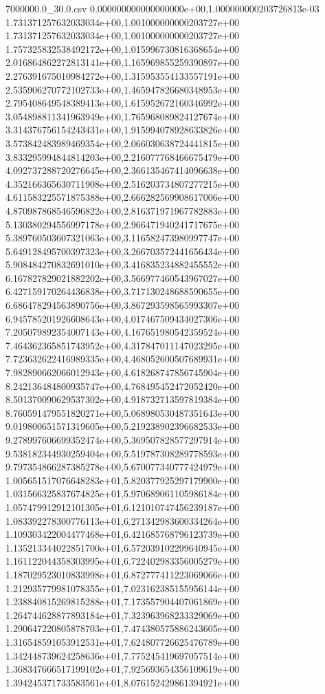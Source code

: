 \begin{filecontents*}{7000000.0_30.0.csv}
0.000000000000000000e+00,1.000000000203726813e-03
1.731371257632033034e+00,1.001000000000203727e+00
1.731371257632033034e+00,1.001000000000203727e+00
1.757325832538492172e+00,1.015996730816368654e+00
2.016864862272813141e+00,1.165969855259390897e+00
2.276391675010984272e+00,1.315953554133557191e+00
2.535906270772102733e+00,1.465947826680348953e+00
2.795408649548389413e+00,1.615952672160346992e+00
3.054898811341963949e+00,1.765968089824127674e+00
3.314376756154243431e+00,1.915994078928633826e+00
3.573842483989469354e+00,2.066030638724441815e+00
3.833295994844814203e+00,2.216077768466675479e+00
4.092737288720276645e+00,2.366135467414096638e+00
4.352166365630711908e+00,2.516203734807277215e+00
4.611583225571875388e+00,2.666282569908617006e+00
4.870987868546596822e+00,2.816371971967782883e+00
5.130380294556997178e+00,2.966471940241717675e+00
5.389760503607321063e+00,3.116582473980997747e+00
5.649128495700397323e+00,3.266703572441656434e+00
5.908484270832691010e+00,3.416835234882455552e+00
6.167827829021882202e+00,3.566977460543967027e+00
6.427159170264436838e+00,3.717130248688590655e+00
6.686478294563890756e+00,3.867293598565993307e+00
6.945785201926608643e+00,4.017467509434027306e+00
7.205079892354007143e+00,4.167651980542359524e+00
7.464362365851743952e+00,4.317847011147023295e+00
7.723632622416989335e+00,4.468052600507689931e+00
7.982890662066012943e+00,4.618268747856745904e+00
8.242136484800935747e+00,4.768495452472052420e+00
8.501370090629537302e+00,4.918732713597819384e+00
8.760591479551820271e+00,5.068980530487351643e+00
9.019800651571319605e+00,5.219238902396682533e+00
9.278997606699352474e+00,5.369507828577297914e+00
9.538182344930259404e+00,5.519787308289778593e+00
9.797354866287385278e+00,5.670077340777424979e+00
1.005651517076648283e+01,5.820377925297179900e+00
1.031566325837674825e+01,5.970689061105986184e+00
1.057479912912101305e+01,6.121010747456239187e+00
1.083392278300776113e+01,6.271342983600334264e+00
1.109303422004477468e+01,6.421685768796123739e+00
1.135213344022851700e+01,6.572039102299640945e+00
1.161122044358303995e+01,6.722402983356005279e+00
1.187029523010833998e+01,6.872777411223069066e+00
1.212935779981078355e+01,7.023162385155956144e+00
1.238840815269815288e+01,7.173557904407061869e+00
1.264744628877893184e+01,7.323963968233329069e+00
1.290647220805878703e+01,7.474380575886243605e+00
1.316548591053912531e+01,7.624807726625476789e+00
1.342448739624258636e+01,7.775245419697057514e+00
1.368347666517199102e+01,7.925693654356109619e+00
1.394245371733583561e+01,8.076152429861394921e+00

\end{filecontents*}
